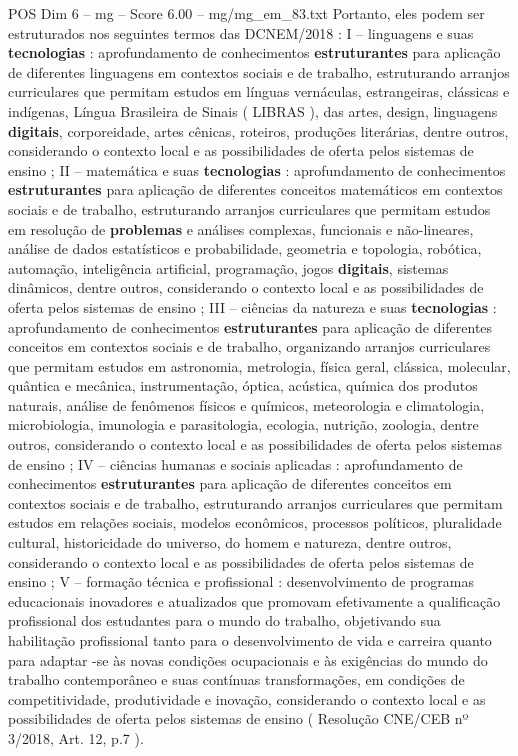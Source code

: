 \begin{textsample}{POS Dim 6 – mg – Score 6.00 – mg/mg\_em\_83.txt}
Portanto, eles podem ser estruturados nos seguintes termos das DCNEM/2018 : I – linguagens e suas \textbf{tecnologias} : aprofundamento de conhecimentos \textbf{estruturantes} para aplicação de diferentes linguagens em contextos sociais e de trabalho, estruturando arranjos curriculares que permitam estudos em línguas vernáculas, estrangeiras, clássicas e indígenas, Língua Brasileira de Sinais ( LIBRAS ), das artes, design, linguagens \textbf{digitais}, corporeidade, artes cênicas, roteiros, produções literárias, dentre outros, considerando o contexto local e as possibilidades de oferta pelos sistemas de ensino ; II – matemática e suas \textbf{tecnologias} : aprofundamento de conhecimentos \textbf{estruturantes} para aplicação de diferentes conceitos matemáticos em contextos sociais e de trabalho, estruturando arranjos curriculares que permitam estudos em resolução de \textbf{problemas} e análises complexas, funcionais e não-lineares, análise de dados estatísticos e probabilidade, geometria e topologia, robótica, automação, inteligência artificial, programação, jogos \textbf{digitais}, sistemas dinâmicos, dentre outros, considerando o contexto local e as possibilidades de oferta pelos sistemas de ensino ; III – ciências da natureza e suas \textbf{tecnologias} : aprofundamento de conhecimentos \textbf{estruturantes} para aplicação de diferentes conceitos em contextos sociais e de trabalho, organizando arranjos curriculares que permitam estudos em astronomia, metrologia, física geral, clássica, molecular, quântica e mecânica, instrumentação, óptica, acústica, química dos produtos naturais, análise de fenômenos físicos e químicos, meteorologia e climatologia, microbiologia, imunologia e parasitologia, ecologia, nutrição, zoologia, dentre outros, considerando o contexto local e as possibilidades de oferta pelos sistemas de ensino ; IV – ciências humanas e sociais aplicadas : aprofundamento de conhecimentos \textbf{estruturantes} para aplicação de diferentes conceitos em contextos sociais e de trabalho, estruturando arranjos curriculares que permitam estudos em relações sociais, modelos econômicos, processos políticos, pluralidade cultural, historicidade do universo, do homem e natureza, dentre outros, considerando o contexto local e as possibilidades de oferta pelos sistemas de ensino ; V – formação técnica e profissional : desenvolvimento de programas educacionais inovadores e atualizados que promovam efetivamente a qualificação profissional dos estudantes para o mundo do trabalho, objetivando sua habilitação profissional tanto para o desenvolvimento de vida e carreira quanto para adaptar -se às novas condições ocupacionais e às exigências do mundo do trabalho contemporâneo e suas contínuas transformações, em condições de competitividade, produtividade e inovação, considerando o contexto local e as possibilidades de oferta pelos sistemas de ensino ( Resolução CNE/CEB nº 3/2018, Art. 12, p.7 ).

\end{textsample}
